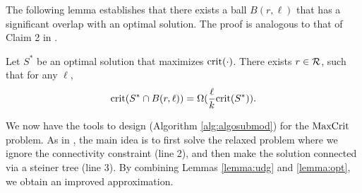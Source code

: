 
The following lemma establishes that there exists a ball $B(r, \ell)$ that has a significant overlap with an optimal solution. The proof is analogous to that of Claim 2 in \cite{kuo2015maximizing}.

\begin{lemma}
\label{lemma:opt}
Let $S^*$ be an optimal solution that maximizes $\text{crit}(\cdot)$. There exists $r\in \mathcal{R}$, such that for any $\ell$,
$$
\text{crit}(S^*\cap B(r, \ell))=\Omega(\frac{\ell}{k}\text{crit}(S^*)).
$$
\end{lemma}

We now have the tools to design \algosubmod{} (Algorithm \ref{alg:algosubmod}) for the $\text{MaxCrit}{}$ problem. As in \cite{kuo2015maximizing}, the main idea is to first solve the relaxed problem where we ignore the connectivity constraint (line 2), and then make the solution connected via a steiner tree (line 3). By combining Lemmas \ref{lemma:udg} and \ref{lemma:opt}, we obtain an improved approximation.

